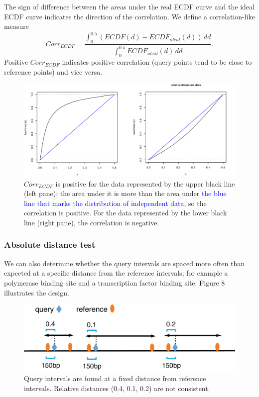\documentclass{article}
\begin{document}
The sign of difference between the areas under the real ECDF curve and the ideal ECDF curve indicates the direction of the correlation. We define a correlation-like measure
\[Corr_{ECDF}=\displaystyle\frac{\displaystyle\int_0^{0.5} \! \left( ECDF(d)-ECDF_{ideal}(d) \right) \, dd}{\displaystyle\int_0^{0.5} \! ECDF_{ideal}(d) \, dd} .\] Positive $Corr_{ECDF}$ indicates positive correlation (query points tend to be close to reference points) and vice versa. 
\begin{figure}[h!]
	\centering\includegraphics[scale=\picscale]{png/fig7}
	\caption{$Corr_{ECDF}$ is positive for the data represented by the upper black line (left pane); the area under it is more than the area under \textcolor{blue}{the blue line that marks the distribution of independent data}, so the correlation is positive. For the data represented by the lower black line (right pane), the correlation is negative.}
\end{figure}

\subsubsection{Absolute distance test}
We can also determine whether the query intervals are spaced more often than expected at a specific distance from the reference intervals; for example a polymerase binding site and a transcription factor binding site. Figure 8 illustrates the design.
\begin{figure}[h!]
        \centering\includegraphics[scale=\picscale]{png/fig8}
        \caption{Query intervals are found at a fixed distance from reference intervals. Relative distances (0.4, 0.1, 0.2) are not consistent.}
\end{figure}
\end{document}
